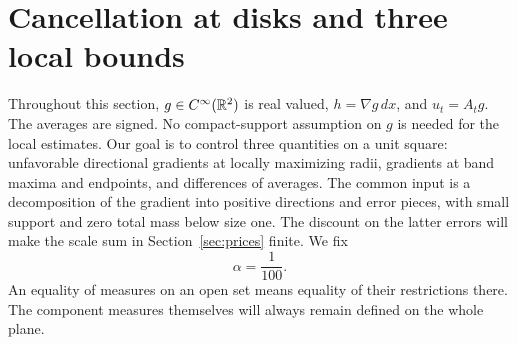 \section{Cancellation at disks and three local bounds}
\label{sec:local}

Throughout this section, $g\in C^\infty(\mathbb R^2)$ is real valued,
$h=\nabla g\,dx$, and $u_t=A_tg$. The averages are signed. No
compact-support assumption on $g$ is needed for the local estimates.
Our goal is to control three quantities on a unit square: unfavorable
directional gradients at locally maximizing radii, gradients at band
maxima and endpoints, and differences of averages. The common input is
a decomposition of the gradient into positive directions and error
pieces, with small support and zero total mass below size one. The discount on the latter errors will make the
scale sum in Section~\ref{sec:prices} finite.
We fix
\begin{equation}\label{eq:local-alpha}
\alpha=\frac1{100}.
\end{equation}
An equality of measures on an open set means equality of their
restrictions there. The component measures themselves will always
remain defined on the whole plane.

